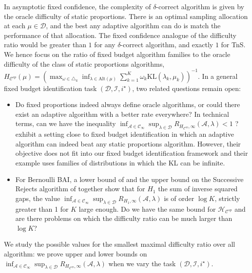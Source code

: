 \documentclass{article}
\newcommand{\KL}{\mathrm{KL}}
\newcommand{\alt}{\mathrm{Alt}}
\begin{document}
In asymptotic fixed confidence, the complexity of $\delta$-correct algorithm is given by the oracle difficulty of static proportions. There is an optimal sampling allocation at each $\mu \in \mathcal D$, and the best any adaptive algorithm can do is match the performance of that allocation.
The fixed confidence analogue of the difficulty ratio would be greater than $1$ for any $\delta$-correct algorithm, and exactly $1$ for TnS.
We hence focus on the ratio of fixed budget algorithm families to the oracle difficulty of the class of static proportions algorithms, $H_{\mathcal C^{sp}}(\mu) = \left( \max_{\omega \in \triangle_k} \inf_{\lambda \in \alt(\mu)} \sum_{k=1}^K \omega_k \KL(\lambda_k, \mu_k) \right)^{-1}$.
In a general fixed budget identification task $(\mathcal D, \mathcal I, i^\star)$, two related questions remain open:
\begin{itemize}
	\item Do fixed proportions indeed always define oracle algorithms, or could there exist an adaptive algorithm with a better rate everywhere? In technical terms, can we have the inequality $\inf_{\mathcal A \in \mathcal C_\infty} \sup_{\lambda\in \mathcal D} R_{H_{\mathcal C^{sp}},\infty}(\mathcal A, \lambda)  < 1$ ? \cite{ouhamma2021online} exhibit a setting close to fixed budget identification in which an adaptive algorithm can indeed beat any static proportions algorithm. However, their objective does not fit into our fixed budget identification framework and their example uses families of distributions in which the KL can be infinite.
	\item For Bernoulli BAI, a lower bound of \cite{carpentier2016tight} and the upper bound on the Successive Rejects algorithm of \cite{audibert2010best} together show that for $H_1$ the sum of inverse squared gaps, the value $\inf_{\mathcal A \in \mathcal C_\infty} \sup_{\lambda\in \mathcal D} R_{H_1,\infty}(\mathcal A, \lambda)$ is of order $\log K$, strictly greater than 1 for $K$ large enough. Do we have the same bound for $\mathcal H_{\mathcal C^{sp}}$ and are there problems on which the difficulty ratio can be much larger than $\log K$?
\end{itemize}

We study the possible values for the smallest maximal difficulty ratio over all algorithm: we prove upper and lower bounds on $\inf_{\mathcal A \in \mathcal C_\infty} \sup_{\lambda\in \mathcal D} R_{H_{\mathcal C^{sp}},\infty}(\mathcal A, \lambda) $ when we vary the task $(\mathcal D, \mathcal I, i^\star)$.
\end{document}

